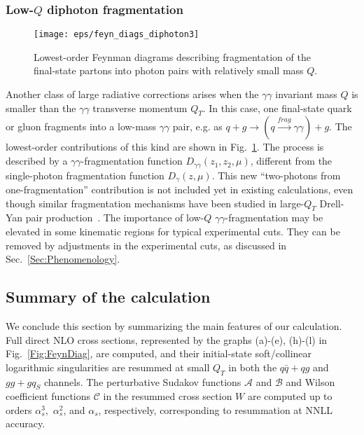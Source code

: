 \documentclass[12pt,english,aps,preprint,prd,letterpaper,fleqn,nofootinbib,showpacs,showkeys,tightenlines,floatfix]{revtex4}
\begin{document}
\subsubsection{Low-$Q$ diphoton fragmentation \label{sub:Low-Q-diphoton-fragmentation}}

\begin{figure}
\begin{centering}\texttt{[image: eps/feyn\_diags\_diphoton3]}\par\end{centering}


\caption{Lowest-order Feynman diagrams describing fragmentation of the final-state
partons into photon pairs with relatively small mass $Q$. \label{fig:LowQfrag}}
\end{figure}


Another class of large radiative corrections arises when the $\gamma\gamma$
invariant mass $Q$ is smaller than the $\gamma\gamma$ transverse momentum
$Q_{T}$. In this case, one final-state quark or gluon fragments into
a low-mass $\gamma\gamma$ pair, e.g. as 
$q+g\rightarrow(q\stackrel{frag}{\longrightarrow}\gamma\gamma)+g$. The 
lowest-order contributions of this kind are shown in Fig.~\ref{fig:LowQfrag}.
The process is described by a $\gamma\gamma$-fragmentation function
$D_{\gamma\gamma}(z_{1},z_{2},\mu)$, different from the single-photon
fragmentation function $D_{\gamma}(z,\mu)$. This new {}``two-photons from one-fragmentation''
contribution is not included yet in existing calculations, even though
similar fragmentation mechanisms have been studied in large-$Q_{T}$
Drell-Yan pair production~\cite{Berger:1998ev,Berger:2001wr}. The
importance of low-$Q$ $\gamma\gamma$-fragmentation may be elevated
in some kinematic regions for typical experimental cuts. They can
be removed by adjustments in the experimental cuts, as discussed in
Sec.~\ref{Sec:Phenomenology}.


\subsection{Summary of the calculation \label{sub:TheorySummary}}

We conclude this section by summarizing the main features of our calculation.
Full direct NLO cross sections, represented by the graphs (a)-(e),
(h)-(l) in Fig.~\ref{Fig:FeynDiag}, are computed, and their initial-state 
soft/collinear logarithmic singularities are resummed at
small $Q_{T}$ in both the $q\bar{q}+qg$ and $gg+gq_{S}$ channels.
The perturbative Sudakov functions ${\mathcal{A}}$ and ${\mathcal{B}}$
and Wilson coefficient functions ${\mathcal{C}}$ in the resummed
cross section $W$ are computed up to orders $\alpha_{s}^{3},$ $\alpha_{s}^{2}$,
and $\alpha_{s}$, respectively, corresponding to resummation at NNLL
accuracy.
\end{document}
